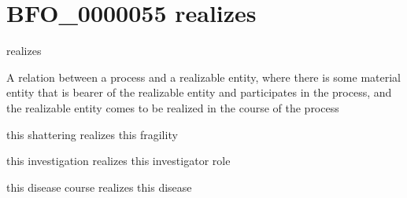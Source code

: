 \documentclass[letterpaper,10pt,english]{sphinxmanual}
\begin{document}
\begin{sphinxShadowBox}

\sphinxAtStartPar
{}
\end{sphinxShadowBox}
\begin{quote}
\label{\detokenize{doc-BFO_0000055:bfo-0000055}}\label{\detokenize{doc-BFO_0000055:realizes}}\label{\detokenize{doc-BFO_0000055:bfo-0000055}}
\ignorespaces \end{quote}


\section{BFO\_0000055 \sphinxhyphen{} realizes}
\label{\detokenize{doc-BFO_0000055:bfo-0000055-realizes}}\label{\detokenize{doc-BFO_0000055:index-0}}\label{\detokenize{doc-BFO_0000055::doc}}
\begin{sphinxShadowBox}

\sphinxAtStartPar
realizes
\end{sphinxShadowBox}

\begin{sphinxShadowBox}

\sphinxAtStartPar
A relation between a process and a realizable entity, where there is some material entity that is bearer of the realizable entity and participates in the process, and the realizable entity comes to be realized in the course of the process
\end{sphinxShadowBox}

\begin{sphinxShadowBox}

\sphinxAtStartPar
this shattering realizes this fragility

\sphinxAtStartPar
this investigation realizes this investigator role

\sphinxAtStartPar
this disease course realizes this disease
\end{sphinxShadowBox}

\begin{sphinxShadowBox}

\sphinxAtStartPar
{}
\end{sphinxShadowBox}
\begin{quote}
\label{\detokenize{doc-IAO_0000136:iao-0000136}}\label{\detokenize{doc-IAO_0000136:is-about}}\label{\detokenize{doc-IAO_0000136:iao-0000136}}
\ignorespaces \end{quote}
\end{document}
